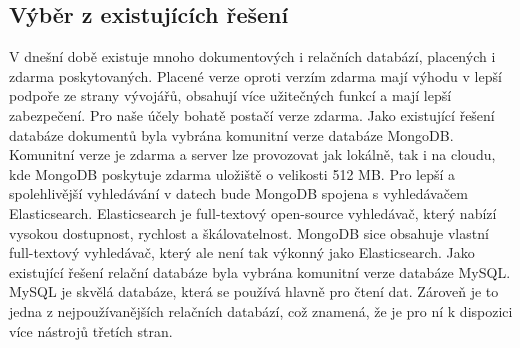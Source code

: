 \subsection{Výběr z existujících řešení}
V dnešní době existuje mnoho dokumentových i relačních databází, placených i zdarma poskytovaných. Placené verze oproti verzím zdarma mají výhodu v lepší podpoře ze strany vývojářů, obsahují více užitečných funkcí a mají lepší zabezpečení. Pro naše účely bohatě postačí verze zdarma.
\newline
\indent Jako existující řešení databáze dokumentů byla vybrána komunitní verze databáze MongoDB. Komunitní verze je zdarma a server lze provozovat jak lokálně, tak i na cloudu, kde MongoDB poskytuje zdarma uložiště o velikosti 512 MB. Pro lepší a spolehlivější vyhledávání v datech bude MongoDB spojena s vyhledávačem Elasticsearch. Elasticsearch je full-textový open-source vyhledávač, který nabízí vysokou dostupnost, rychlost a škálovatelnost. MongoDB sice obsahuje vlastní full-textový vyhledávač, který ale není tak výkonný jako Elasticsearch.
\newline
\indent Jako existující řešení relační databáze byla vybrána komunitní verze databáze MySQL. MySQL je skvělá databáze, která se používá hlavně pro čtení dat. Zároveň je to jedna z nejpoužívanějších relačních databází, což znamená, že je pro ní k dispozici více nástrojů třetích stran.
